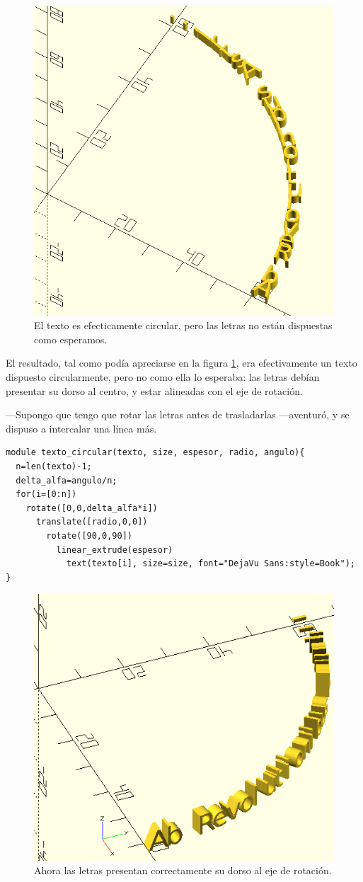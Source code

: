 \begin{figure}[ht]
  \centering
  \includegraphics[width=.7\textwidth]{imagenes/texto-circular-1}  
  \caption{El texto es efecticamente circular, pero las letras no
    están dispuestas como esperamos.}
  \label{fig:texto-circular-1}
\end{figure}


El resultado, tal como podía apreciarse en la figura
\ref{fig:texto-circular-1}, era efectivamente un texto dispuesto
circularmente, pero no como ella lo esperaba: las letras debían
presentar su dorso al centro, y estar alineadas con el eje de
rotación.

---Supongo que tengo que rotar las letras antes de trasladarlas
---aventuró, y se dispuso a intercalar una línea más.

\begin{lstlisting}
module texto_circular(texto, size, espesor, radio, angulo){
  n=len(texto)-1;
  delta_alfa=angulo/n;
  for(i=[0:n])
    rotate([0,0,delta_alfa*i])
      translate([radio,0,0])
        rotate([90,0,90])
          linear_extrude(espesor)
            text(texto[i], size=size, font="DejaVu Sans:style=Book");
}
\end{lstlisting}


\begin{figure}[ht]
  \centering
  \includegraphics[width=.7\textwidth]{imagenes/texto-circular-2}  
  \caption{Ahora las letras presentan correctamente su dorso al eje de
    rotación.}
  \label{fig:texto-circular-2}
\end{figure}


